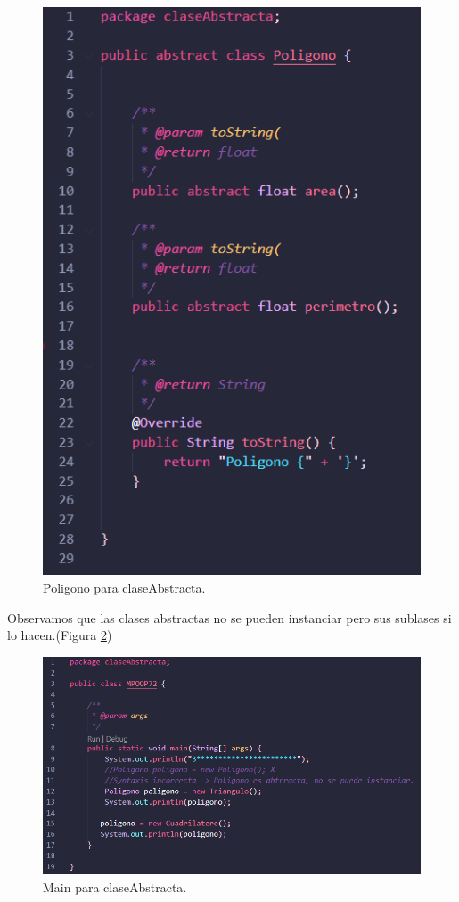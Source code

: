 \documentclass[conference]{IEEEtran}
\begin{document}
        \begin{figure}[htbp]
            \centerline{\includegraphics[scale=0.4]{./pics/6}}
            \caption{Poligono para claseAbstracta.}
            \label{fig5}
        \end{figure}
            
        Observamos que las clases abstractas no se pueden instanciar pero sus sublases si lo hacen.(Figura \ref{fig6})

        \begin{figure}[htbp]
            \centerline{\includegraphics[scale=0.35]{./pics/9}}
            \caption{Main para claseAbstracta.}
            \label{fig6}
        \end{figure}
\end{document}
